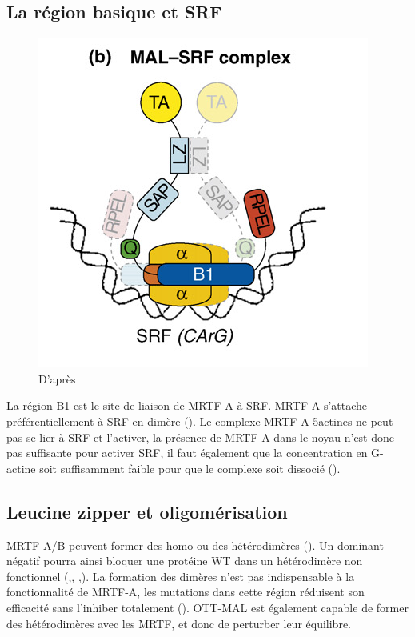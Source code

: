  \subsection{La région basique et SRF}
 \begin{figure}[h!]
 \includegraphics[scale=0.5]{MRTFA_SRF_complex.png}
 \caption{D'après \cite{posern_actin_2006}}
 \end{figure}
 La région B1 est le site de liaison de MRTF-A à SRF. MRTF-A s'attache préférentiellement à SRF en dimère (\cite{miralles_actin_2003}). Le complexe MRTF-A-5actines ne peut pas se lier à SRF et l'activer, la présence de MRTF-A dans le noyau n'est donc pas suffisante pour activer SRF, il faut également que la concentration en G-actine soit suffisamment faible pour que le complexe soit dissocié (\cite{vartiainen_nuclear_2007}). 
 \subsection{Leucine zipper et oligomérisation}
 MRTF-A/B peuvent former des homo ou des hétérodimères (\cite{miralles_actin_2003}). Un dominant négatif pourra ainsi bloquer une protéine WT dans un hétérodimère non fonctionnel (\cite{selvaraj_megakaryoblastic_2003},\cite{cen_myocardin/mkl_2004}, \cite{li_requirement_2005},\cite{rajakyla_actin-regulated_2010}). La formation des dimères n'est pas indispensable à la fonctionnalité de MRTF-A, les mutations dans cette région réduisent son efficacité sans l'inhiber totalement (\cite{selvaraj_megakaryoblastic_2003}). 
 OTT-MAL est également capable de former des hétérodimères avec les MRTF, et donc de perturber leur équilibre. 
 
